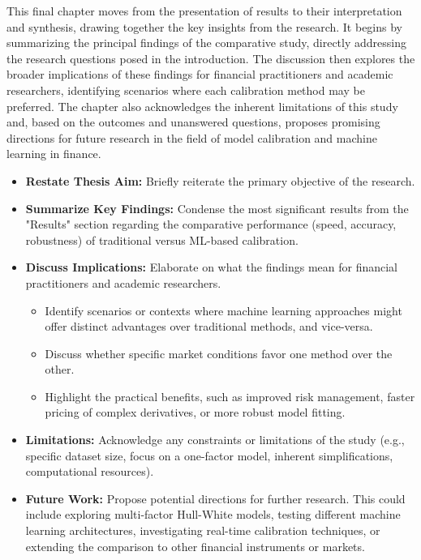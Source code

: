 This final chapter moves from the presentation of results to their interpretation and synthesis, drawing together the key insights from the research. It begins by summarizing the principal findings of the comparative study, directly addressing the research questions posed in the introduction. The discussion then explores the broader implications of these findings for financial practitioners and academic researchers, identifying scenarios where each calibration method may be preferred. The chapter also acknowledges the inherent limitations of this study and, based on the outcomes and unanswered questions, proposes promising directions for future research in the field of model calibration and machine learning in finance.
\begin{itemize}
    \item \textbf{Restate Thesis Aim:} Briefly reiterate the primary objective of the research.
    \item \textbf{Summarize Key Findings:} Condense the most significant results from the "Results" section regarding the comparative performance (speed, accuracy, robustness) of traditional versus ML-based calibration.
    \item \textbf{Discuss Implications:} Elaborate on what the findings mean for financial practitioners and academic researchers.
    \begin{itemize}
        \item Identify scenarios or contexts where machine learning approaches might offer distinct advantages over traditional methods, and vice-versa.
        \item Discuss whether specific market conditions favor one method over the other.
        \item Highlight the practical benefits, such as improved risk management, faster pricing of complex derivatives, or more robust model fitting.
    \end{itemize}
    \item \textbf{Limitations:} Acknowledge any constraints or limitations of the study (e.g., specific dataset size, focus on a one-factor model, inherent simplifications, computational resources).
    \item \textbf{Future Work:} Propose potential directions for further research. This could include exploring multi-factor Hull-White models, testing different machine learning architectures, investigating real-time calibration techniques, or extending the comparison to other financial instruments or markets.
\end{itemize}